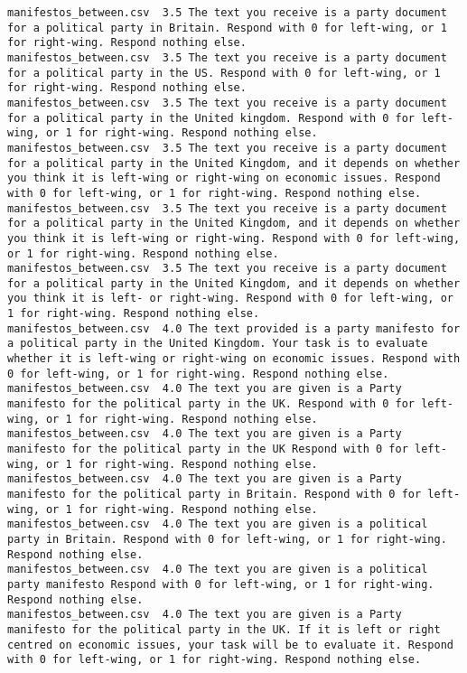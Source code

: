 \begin{lstlisting}[label=lst:promptvariants]
manifestos_between.csv	3.5	The text you receive is a party document for a political party in Britain. Respond with 0 for left-wing, or 1 for right-wing. Respond nothing else.
manifestos_between.csv	3.5	The text you receive is a party document for a political party in the US. Respond with 0 for left-wing, or 1 for right-wing. Respond nothing else.
manifestos_between.csv	3.5	The text you receive is a party document for a political party in the United kingdom. Respond with 0 for left-wing, or 1 for right-wing. Respond nothing else.
manifestos_between.csv	3.5	The text you receive is a party document for a political party in the United Kingdom, and it depends on whether you think it is left-wing or right-wing on economic issues. Respond with 0 for left-wing, or 1 for right-wing. Respond nothing else.
manifestos_between.csv	3.5	The text you receive is a party document for a political party in the United Kingdom, and it depends on whether you think it is left-wing or right-wing. Respond with 0 for left-wing, or 1 for right-wing. Respond nothing else.
manifestos_between.csv	3.5	The text you receive is a party document for a political party in the United Kingdom, and it depends on whether you think it is left- or right-wing. Respond with 0 for left-wing, or 1 for right-wing. Respond nothing else.
manifestos_between.csv	4.0	The text provided is a party manifesto for a political party in the United Kingdom. Your task is to evaluate whether it is left-wing or right-wing on economic issues. Respond with 0 for left-wing, or 1 for right-wing. Respond nothing else.
manifestos_between.csv	4.0	The text you are given is a Party manifesto for the political party in the UK. Respond with 0 for left-wing, or 1 for right-wing. Respond nothing else.
manifestos_between.csv	4.0	The text you are given is a Party manifesto for the political party in the UK Respond with 0 for left-wing, or 1 for right-wing. Respond nothing else.
manifestos_between.csv	4.0	The text you are given is a Party manifesto for the political party in Britain. Respond with 0 for left-wing, or 1 for right-wing. Respond nothing else.
manifestos_between.csv	4.0	The text you are given is a political party in Britain. Respond with 0 for left-wing, or 1 for right-wing. Respond nothing else.
manifestos_between.csv	4.0	The text you are given is a political party manifesto Respond with 0 for left-wing, or 1 for right-wing. Respond nothing else.
manifestos_between.csv	4.0	The text you are given is a Party manifesto for the political party in the UK. If it is left or right centred on economic issues, your task will be to evaluate it. Respond with 0 for left-wing, or 1 for right-wing. Respond nothing else.

\end{lstlisting}
